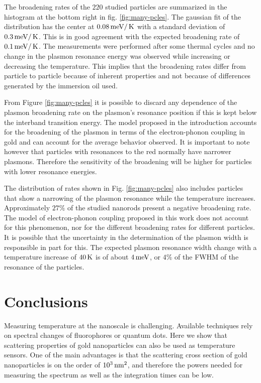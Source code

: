 The broadening rates of the $220$ studied particles are summarized in the
histogram at the bottom right in fig. \ref{fig:many-pcles}. The gaussian fit of
the distribution has the center at $0.08 \,\textrm{meV}/\,\textrm{K}$ with a standard deviation of
$0.3 \,\textrm{meV}/\,\textrm{K}$. This is in good agreement with the expected broadening rate of
$0.1\,\textrm{meV}/\,\textrm{K}$. The measurements were performed after some thermal cycles and no
change in the plasmon resonance energy was observed while increasing or
decreasing the temperature. This implies that the broadening rates differ from
particle to particle because of inherent properties and not because of
differences generated by the immersion oil used. 

From Figure \ref{fig:many-pcles} it is possible to discard any dependence of the
plasmon broadening rate on the plasmon's resonance position if this is kept
below the interband transition energy. The model proposed in the introduction
accounts for the broadening of the plasmon in terms of the electron-phonon
coupling in gold and can account for the average behavior observed. It is
important to note however that particles with resonances to the red normally
have narrower plasmons\cite{Sonnichsen2002}. Therefore the sensitivity of the
broadening will be higher for particles with lower resonance energies.

The distribution of rates shown in Fig. \ref{fig:many-pcles} also includes
particles that show a narrowing of the plasmon resonance while the temperature
increases. Approximately $27\%$ of the studied nanorods present a negative
broadening rate. The model of electron-phonon coupling proposed in this
work does not account for this phenomenon, nor for the different broadening
rates for different particles. It is possible that the uncertainty in the
determination of the plasmon width is responsible in part for this. The expected
plasmon resonance width change with a temperature increase of $40\,\textrm{K}$ is of about
$4\,\textrm{meV}$, or $4\%$ of the FWHM of the resonance of the particles. 

\section{Conclusions}
Measuring temperature at the nanoscale is challenging. Available techniques rely
on spectral changes of fluorophores\cite{Chapman1995a} or quantum
dots\cite{Tanimoto2016,Yang2011a}. Here we show that scattering properties of
gold nanoparticles can also be used as temperature sensors. One of the main
advantages is that the scattering cross section of gold nanoparticles is on the
order of $10^3\,\textrm{nm}^2$, and therefore the powers needed for measuring the spectrum
as well as the integration times can be low.

